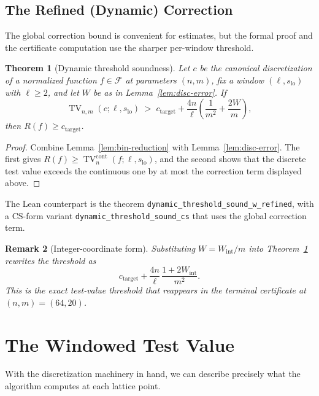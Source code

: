 \documentclass[11pt, letterpaper]{article}
\theoremstyle{paperplain}
\newtheorem{theorem}{Theorem}[section]
\theoremstyle{paperdef}
\newtheorem{remark}[theorem]{Remark}
\begin{document}
\subsection{The Refined (Dynamic) Correction}

The global correction bound is convenient for estimates, but the formal
proof and the certificate computation use the sharper per-window
threshold.

\begin{theorem}[Dynamic threshold soundness]
\label{thm:dynamic-threshold}
Let $c$ be the canonical discretization of a normalized function
$f\in\mathcal{F}$ at parameters $(n,m)$, fix a window
$(\ell,s_{\mathrm{lo}})$ with $\ell\ge 2$, and let $W$ be as in
Lemma~\ref{lem:disc-error}.  If
\[
  \operatorname{TV}_{n,m}(c;\ell,s_{\mathrm{lo}})
  \;>\;
  c_{\mathrm{target}}
  +
  \frac{4n}{\ell}
  \left(
    \frac{1}{m^2} + \frac{2W}{m}
  \right),
\]
then $R(f)\ge c_{\mathrm{target}}$.
\end{theorem}

\begin{proof}
Combine Lemma~\ref{lem:bin-reduction} with
Lemma~\ref{lem:disc-error}.  The first gives
$R(f)\ge \operatorname{TV}^{\mathrm{cont}}_n(f;\ell,s_{\mathrm{lo}})$,
and the second shows that the discrete test value exceeds the
continuous one by at most the correction term displayed above.
\end{proof}

The Lean counterpart is the theorem
\texttt{dynamic\_threshold\_sound\_w\_refined}, with a CS-form
variant \texttt{dynamic\_threshold\_sound\_cs} that uses the global
correction term.

\begin{remark}[Integer-coordinate form]
Substituting $W = W_{\mathrm{int}}/m$ into
Theorem~\ref{thm:dynamic-threshold} rewrites the threshold as
\[
  c_{\mathrm{target}}
  +
  \frac{4n}{\ell}\,
  \frac{1+2W_{\mathrm{int}}}{m^2}.
\]
This is the exact test-value threshold that reappears in the terminal
certificate at $(n,m)=(64,20)$.
\end{remark}

\section{The Windowed Test Value}\label{sec:testvalue}

With the discretization machinery in hand, we can describe precisely
what the algorithm computes at each lattice point.
\end{document}
